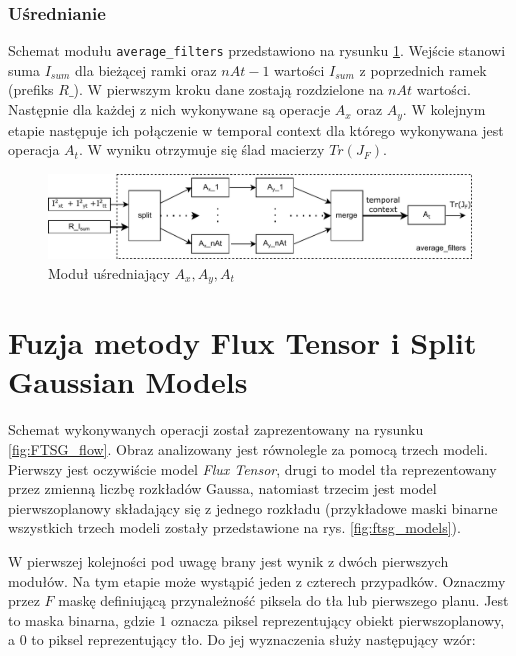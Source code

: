 \documentclass[10pt,a4paper]{article}
\begin{document}
\subsubsection{Uśrednianie}
\label{ssec:spatial_averaging}

Schemat modułu \texttt{average\_filters} przedstawiono na rysunku \ref{fig:jpk_spatial_averaging}.
Wejście stanowi suma $I_{sum}$ dla bieżącej ramki oraz $nAt-1$ wartości $I_{sum}$ z poprzednich ramek (prefiks $R\_$).
W pierwszym kroku dane zostają rozdzielone na $nAt$ wartości.
Następnie dla każdej z nich wykonywane są operacje $A_x$ oraz $A_y$.
W kolejnym etapie następuje ich połączenie w temporal context dla którego wykonywana jest operacja $A_t$.
W wyniku otrzymuje się ślad macierzy $Tr(J_F)$.

\begin{figure}[h]
	\centering
	\includegraphics[width=12cm]{img/jpk_spatial_averaging.pdf}
	\caption{Moduł uśredniający $A_x, A_y, A_t$}
	\label{fig:jpk_spatial_averaging}
\end{figure}

\section{Fuzja metody Flux Tensor i Split Gaussian Models}
\label{sec:ftsg_fuzja}
Schemat wykonywanych operacji został zaprezentowany na rysunku \ref{fig:FTSG_flow}. Obraz analizowany jest równolegle za pomocą trzech modeli. Pierwszy jest oczywiście model \textit{Flux Tensor}, drugi to model tła reprezentowany przez zmienną liczbę rozkładów Gaussa, natomiast trzecim jest model pierwszoplanowy składający się z jednego rozkładu (przykładowe maski binarne wszystkich trzech modeli zostały przedstawione na rys. \ref{fig:ftsg_models}). 

W pierwszej kolejności pod uwagę brany jest wynik z dwóch pierwszych modułów. Na tym etapie może wystąpić jeden z czterech przypadków. Oznaczmy przez $F$ maskę definiującą przynależność piksela do tła lub pierwszego planu. Jest to maska binarna, gdzie $1$ oznacza piksel reprezentujący obiekt pierwszoplanowy, a $0$ to piksel reprezentujący tło. Do jej wyznaczenia służy następujący wzór:
\end{document}
